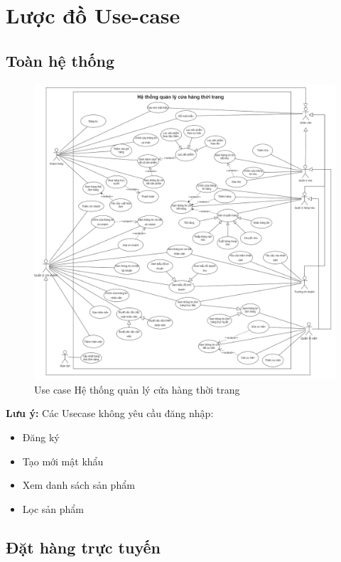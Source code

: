 \section{Lược đồ Use-case}
\subsection{Toàn hệ thống}
\begin{figure}[!htp]
    \centering    \includegraphics[width=16.5cm]{img/UseCase/UseCase-full.drawio.png}
    \newline
    \caption{Use case Hệ thống quản lý cửa hàng thời trang}
\end{figure}
\textbf{Lưu ý:} Các Usecase không yêu cầu đăng nhập:
\begin{itemize}
    \item Đăng ký
    \item Tạo mới mật khẩu
    \item Xem danh sách sản phẩm
    \item Lọc sản phẩm
\end{itemize}
\newpage


\subsection{Đặt hàng trực tuyến}

